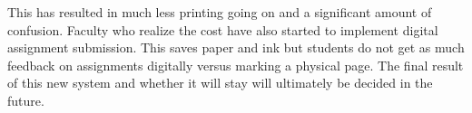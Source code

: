 This has resulted in much less printing going on and a significant amount of confusion.  Faculty who realize the cost have also started to implement digital assignment submission.  This saves paper and ink but students do not get as much feedback on assignments digitally versus marking a physical page.  The final result of this new system and whether it will stay will ultimately be decided in the future.  
